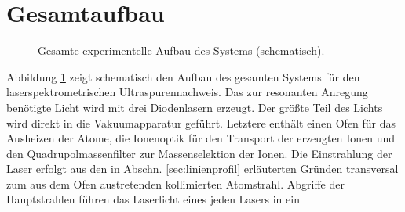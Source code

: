 \section{Gesamtaufbau}\label{sec:gesamtaufbau}
\begin{figure}[h]
 	\centering
	\caption[Gesamter experimenteller Aufbau, schematisch]{Gesamte experimentelle
	Aufbau des Systems (schematisch).}
	\label{fig:experimenteller_aufbau_gesamt}
\end{figure}
Abbildung \ref{fig:experimenteller_aufbau_gesamt} zeigt schematisch den
Aufbau des gesamten Systems für den laserspektrometrischen Ultraspurennachweis.
Das zur resonanten Anregung benötigte Licht wird mit drei Diodenlasern erzeugt. Der größte Teil des Lichts wird
direkt in die Vakuumapparatur geführt. Letztere enthält einen Ofen für das
Ausheizen der Atome, die Ionenoptik für den Transport der erzeugten Ionen und
den Quadrupolmassenfilter zur Massenselektion der Ionen.
Die Einstrahlung der Laser erfolgt aus den in Abschn. \ref{sec:linienprofil}
erläuterten Gründen transversal zum aus dem Ofen austretenden kollimierten Atomstrahl.
Abgriffe der Hauptstrahlen führen das Laserlicht eines jeden Lasers in ein
